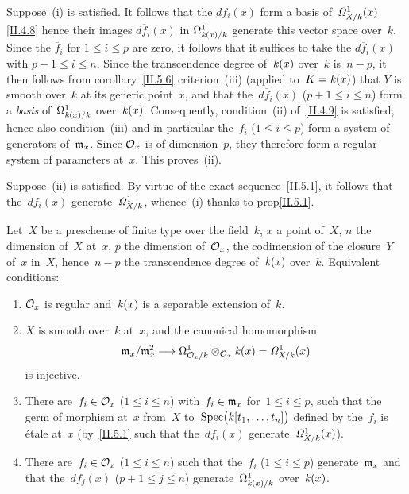 Suppose~(i) is satisfied. It follows that the $df_i(x)$
form a basis of~$\it{\Omega}^1_{X/k}(x)$ \eqref{II.4.8} hence their
images $d\overline{f}_i(x)$ in $\Omega^1_{\kres(x)/k}$ generate
this vector space over~$k$. Since the $\overline{f}_i$ for $1\leq
i\leq p$ are zero, it follows that it suffices to take the
$d\overline{f}_i(x)$ with $p+1\leq i\leq n$. Since the
transcendence degree of~$\kres(x)$ over~$k$ is~$n-p$, it then follows
from corollary~\ref{II.5.6} criterion~(iii) (applied
to~$K=\kres(x)$) that $Y$ is smooth over~$k$ at its
generic point~$x$, and that the~$d\overline{f}_i(x)$ ($p+1\leq i\leq
n$) form a \emph{basis} of~$\Omega^1_{\kres(x)/k}$
over~$\kres(x)$. Consequently, condition~(ii) of~\ref{II.4.9} is
satisfied, hence also condition~(iii) and in particular
the~$f_i$ ($1\leq i\leq p$) form a system of
generators of~$\goth{m}_x$. Since
$\cal{O}_x$ is of dimension~$p$, they therefore form a
regular system of parameters at~$x$. This proves~(ii).

Suppose~(ii) is satisfied. By virtue of the exact
sequence~\eqref{II.5.1}, it follows that the~$df_i(x)$
generate~$\it{\Omega}^1_{X/k}$,
whence~(i) thanks to prop\ptbl\ref{II.5.1}.

\begin{corollary}
\label{II.5.9}
Let~$X$ be a prescheme of finite type over the
field~$k$, $x$ a point of~$X$, $n$ the dimension of~$X$ at~$x$, $p$ the
dimension
of~$\cal{O}_x$,
\ie the codimension of the closure~$Y$
of~$x$ in~$X$, hence~$n-p$ the transcendence degree
of~$\kres(x)$
over~$k$. Equivalent conditions:
\begin{enumerate}
\item[(i)] $\cal{O}_x$ is regular
and~$\kres(x)$
 is a
separable extension of~$k$.
\item[(ii)] $X$ is smooth over~$k$ at~$x$, and the canonical homomorphism
\[
\goth{m}_x/\goth{m}_x^2\to
\Omega^1_{\cal{O}_x/k}\otimes_{\cal{O}_x}
\kres(x)=\it{\Omega}^1_{X/k}(x)
\]
is injective.
\item[(iii)] There are~$f_i\in \cal{O}_x$ ($1\leq i\leq n$)
with~$f_i\in \goth{m}_x$ for~$1\leq i\leq p$, such that the germ of
morphism at~$x$ from~$X$ to~$\Spec\bigl(k[t_1,\dots,t_n]\bigr)$
defined by the~$f_i$ is \'etale at~$x$ (\ie by~\ref{II.5.1}
such that the~$df_i(x)$ generate~$\it{\Omega}^1_{X/k}(x)$).
\item[(iv)] There are~$f_i\in \cal{O}_x$ ($1\leq i\leq n$) such that
the~$f_i$ ($1\leq i\leq p$) generate~$\goth{m}_x$ and that
the~$df_j(x)$ ($p+1\leq j\leq n$)
generate~$\Omega^1_{\kres(x)/k}$ over~$\kres(x)$.
\end{enumerate}
\end{corollary}

